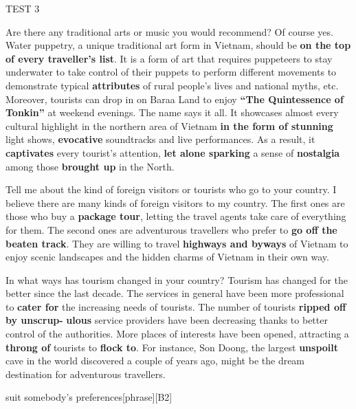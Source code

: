 \begin{glossarymc}[Cambridge 3]
\begin{test}{TEST 3}
\begin{qa}{Are there any traditional arts or music you would recommend?}
Of course yes. Water puppetry, a unique traditional art form in Vietnam, should be \textbf{on the top of every traveller's list}. It is a form of art that requires puppeteers to stay underwater to take control of their puppets to perform different movements to demonstrate typical \textbf{attributes} of rural people's lives and national myths, etc. Moreover, tourists can drop in on Baraa Land to enjoy \textbf{“The Quintessence of Tonkin”} at weekend evenings. The name says it all. It showcases almost every cultural highlight in the northern area of Vietnam \textbf{in the form of stunning} light shows, \textbf{evocative} soundtracks and live performances. As a result, it \textbf{captivates} every tourist's attention, \textbf{let alone sparking} a sense of \textbf{nostalgia} among those \textbf{brought up} in the North.
\end{qa}

\begin{qa}{Tell me about the kind of foreign visitors or tourists who go to your country.}
I believe there are many kinds of foreign visitors to my country. The first ones are those who buy a \textbf{package tour}, letting the travel agents take care of everything for them. The second ones are adventurous travellers who prefer to \textbf{go off the beaten track}. They are willing to travel \textbf{highways and byways} of Vietnam to enjoy scenic landscapes and the hidden charms of Vietnam in their own way.
\end{qa}

\begin{qa}{In what ways has tourism changed in your country?}
Tourism has changed for the better since the last decade. The services in general have been more professional to \textbf{cater for} the increasing needs of tourists. The number of tourists \textbf{ripped off by unscrup-}
\textbf{ulous} service providers have been decreasing thanks to better control of the authorities. More places of interests have been opened, attracting a \textbf{throng of} tourists to \textbf{flock to}. For instance, Son Doong, the largest \textbf{unspoilt} cave in the world discovered a couple of years ago, might be the dream destination for adventurous travellers.
\end{qa}


\begin{VocabExplain}[Part 1]
    \begin{ExplainCard}{suit somebody's preferences}[phrase][B2]
\end{ExplainCard}


\end{VocabExplain}
\end{test}
\end{glossarymc}
